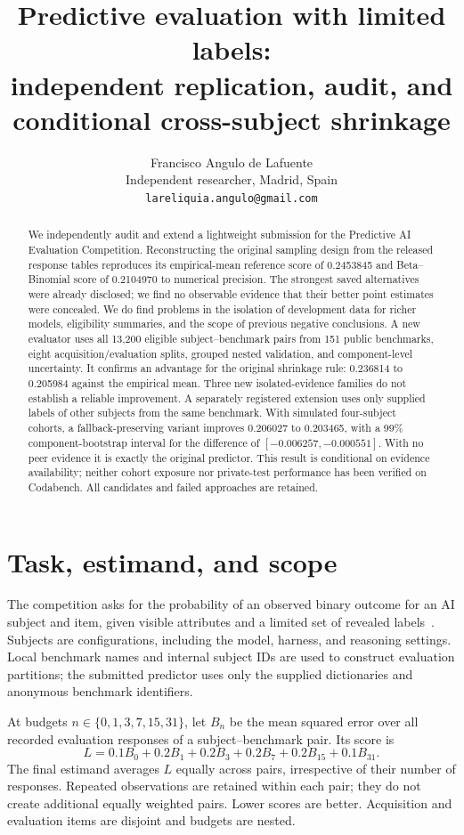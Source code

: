 \documentclass{article}
\title{Predictive evaluation with limited labels:\\
independent replication, audit, and conditional cross-subject shrinkage}
\author{Francisco Angulo de Lafuente\\Independent researcher, Madrid, Spain\\
\texttt{lareliquia.angulo@gmail.com}}
\begin{document}
\maketitle

\begin{abstract}
We independently audit and extend a lightweight submission for the Predictive
AI Evaluation Competition. Reconstructing the original sampling design from
the released response tables reproduces its empirical-mean reference score
of 0.2453845 and Beta--Binomial score of 0.2104970 to numerical precision.
The strongest saved alternatives were already disclosed; we find no observable
evidence that their better point estimates were concealed. We do find problems
in the isolation of development data for richer models, eligibility summaries,
and the scope of previous negative conclusions. A new evaluator uses all
13,200 eligible subject--benchmark pairs from 151 public benchmarks, eight
acquisition/evaluation splits, grouped nested validation, and component-level
uncertainty. It confirms an advantage for the original shrinkage rule:
0.236814 to 0.205984 against the empirical mean. Three new isolated-evidence
families do not establish a reliable improvement. A separately registered
extension uses only supplied labels of other subjects from the same benchmark.
With simulated four-subject cohorts, a fallback-preserving variant improves
0.206027 to 0.203465, with a 99\% component-bootstrap interval for the
difference of $[-0.006257,-0.000551]$. With no peer evidence it is exactly
the original predictor. This result is conditional on evidence availability;
neither cohort exposure nor private-test performance has been verified on
Codabench. All candidates and failed approaches are retained.
\end{abstract}

\section{Task, estimand, and scope}
The competition asks for the probability of an observed binary outcome for an
AI subject and item, given visible attributes and a limited set of revealed
labels~\cite{competition}. Subjects are configurations, including the model,
harness, and reasoning settings. Local benchmark names and internal subject
IDs are used to construct evaluation partitions; the submitted predictor uses
only the supplied dictionaries and anonymous benchmark identifiers.

At budgets $n\in\{0,1,3,7,15,31\}$, let $B_n$ be the mean squared error over
all recorded evaluation responses of a subject--benchmark pair. Its score is
\begin{equation}
 L=0.1B_0+0.2B_1+0.2B_3+0.2B_7+0.2B_{15}+0.1B_{31}.
\end{equation}
The final estimand averages $L$ equally across pairs, irrespective of their
number of responses. Repeated observations are retained within each pair;
they do not create additional equally weighted pairs. Lower scores are better.
Acquisition and evaluation items are disjoint and budgets are nested.
\end{document}
